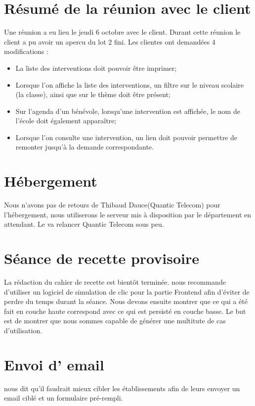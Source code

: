 \documentclass [a4paper] {article}
\begin{document}
\section{Résumé de la réunion avec le client}
Une réunion a eu lieu le jeudi 6 octobre avec le client. Durant cette réunion le client a pu avoir un apercu du lot 2 fini. Les clientes ont demandées 4 modifications : 
\begin{itemize}
	\item	La liste des interventions doit pouvoir être imprimer;
	\item	Lorsque l'on affiche la liste des interventions, un filtre sur le niveau scolaire (la classe), ainsi que sur le thème doit être présent;
	\item	Sur l'agenda d’un bénévole, lorsqu'une intervention est affichée, le nom de l'école doit également apparaître;
	\item	Lorsque l'on consulte une intervention, un lien doit pouvoir permettre de remonter jusqu'à la demande correspondante.
\end{itemize} 


\section{Hébergement}
Nous n'avons pas de retours de Thibaud Dauce(Quantic Telecom) pour l'hébergement, nous utiliserons le serveur mis à disposition par le département en attendant. Le \CP{} va relancer Quantic Telecom sous peu.

\section{Séance de recette provisoire}
La rédaction du cahier de recette est bientôt terminée. \nomTuteurPedago{} nous recommande d'utiliser un logiciel de simulation de clic pour la partie Frontend afin d'éviter de perdre du temps durant la séance. Nous devons ensuite montrer que ce qui a été fait en couche haute correspond avec ce qui est persisté en couche basse. Le but est de montrer que nous sommes capable de générer une multitute de cas d'utilisation.

\section{Envoi d' email}
\nomTuteurPedago{} nous dit qu'il faudrait mieux cibler les établissements afin de leurs envoyer un email ciblé et un formulaire pré-rempli.
\newpage
\end{document}
